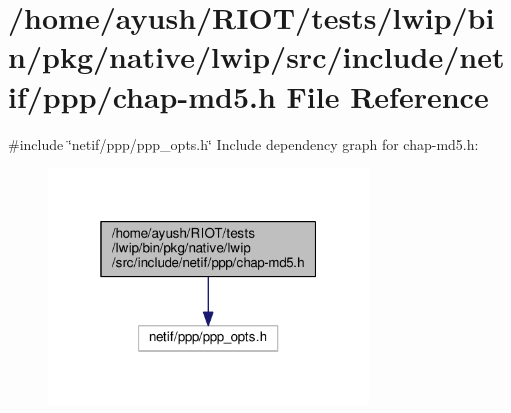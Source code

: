 \hypertarget{native_2lwip_2src_2include_2netif_2ppp_2chap-md5_8h}{}\section{/home/ayush/\+R\+I\+O\+T/tests/lwip/bin/pkg/native/lwip/src/include/netif/ppp/chap-\/md5.h File Reference}
\label{native_2lwip_2src_2include_2netif_2ppp_2chap-md5_8h}
{\ttfamily \#include \char`\"{}netif/ppp/ppp\+\_\+opts.\+h\char`\"{}}\newline
Include dependency graph for chap-\/md5.h\+:
\nopagebreak
\begin{figure}[H]
\begin{center}
\leavevmode
\includegraphics[width=241pt]{native_2lwip_2src_2include_2netif_2ppp_2chap-md5_8h__incl}
\end{center}
\end{figure}

